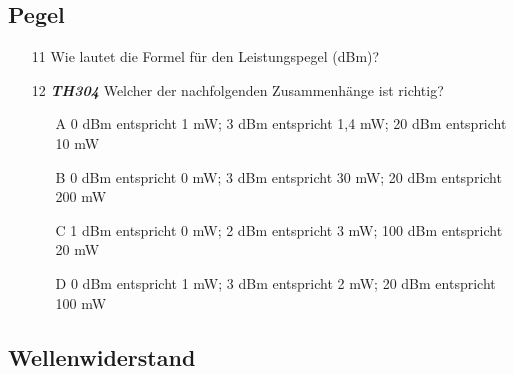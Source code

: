 \subsection*{Pegel}

\begin{enumerate} 
\itemsep1pt\parskip0pt
\item[11] Wie lautet die Formel für den Leistungspegel (dBm)?
\item[12] \emph{\textbf{TH304}}  Welcher der nachfolgenden Zusammenhänge ist richtig?
	\begin{enumerate}
	\itemsep1pt\parskip0pt
		\item[A] 	0 dBm entspricht 1 mW;
					3 dBm entspricht 1,4 mW;
					20 dBm entspricht 10 mW
		\item[B] 	0 dBm entspricht 0 mW;
					3 dBm entspricht 30 mW;
					20 dBm entspricht 200 mW
		\item[C] 	1 dBm entspricht 0 mW;
					2 dBm entspricht 3 mW;
					100 dBm entspricht 20 mW
		\item[D] 	0 dBm entspricht 1 mW;
					3 dBm entspricht 2 mW;
					20 dBm entspricht 100 mW
	\end{enumerate}
\end{enumerate}

\subsection*{Wellenwiderstand}

